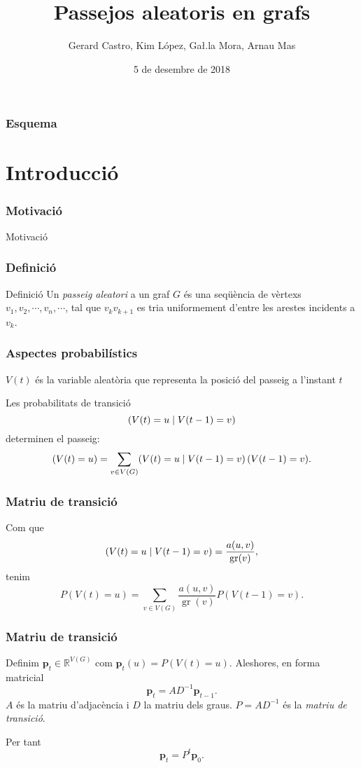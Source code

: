 \documentclass[aspectratio=169, 12pt]{beamer}
\title{Passejos aleatoris en grafs}
\author{Gerard Castro, Kim López, Ga\l.la Mora, Arnau Mas}
\date{5 de desembre de 2018}
\let\P\relax
\DeclareMathOperator{\P}{P}
\renewcommand{\vec}[1]{\mathbf{\bm #1}}
\DeclareMathOperator{\gr}{gr}
\newcommand{\R}{\mathbb{R}}
\begin{document}
\begin{frame}
	\titlepage
\end{frame}

\begin{frame}
	\frametitle{Esquema}
	\tableofcontents

\end{frame}

\section{Introducció}

\begin{frame}
	\frametitle{Motivació}
	Motivació
\end{frame}

\begin{frame}
	\frametitle{Definició}
	\begin{block}{Definició}
		Un \emph{passeig aleatori} a un graf \( G \) és una seqüència de vèrtexs \( v_1, v_2, \cdots, v_n, \cdots \), tal que \( v_kv_{k+1} \) es tria uniformement d'entre les arestes incidents a \( v_k \).
	\end{block}
\end{frame}

\begin{frame}
	\frametitle{Aspectes probabilístics}
	\( V(t) \) és la variable aleatòria que representa la posició del passeig a l'instant \( t \) \pause

	Les probabilitats de transició \[ \P(V(t) = u \mid V(t - 1) = v) \] determinen el passeig: \pause
	\begin{equation*}
		\P(V(t) = u) = \sum_{v \in V(G)} \P(V(t) = u \mid V(t - 1) = v) \, \P(V(t - 1) = v).
	\end{equation*}
\end{frame}

\begin{frame}
	\frametitle{Matriu de transició}
	Com que \[ \P(V(t) = u \mid V(t - 1) = v) = \frac{a(u,v)}{\gr(v)}, \] \pause
	tenim
	\[ P(V(t) = u) = \sum_{v \in V(G)} \frac{a(u,v)}{\gr(v)}P(V(t - 1) = v). \]
\end{frame}

\begin{frame}
	\frametitle{Matriu de transició}
	Definim \( \vec{p}_t \in \R^{V(G)} \) com \( \vec{p}_t(u) = P(V(t) = u) \). \pause Aleshores, en forma matricial \[ \vec{p}_t = AD^{-1} \vec{p}_{t - 1}. \] \( A \) és la matriu d'adjacència i \( D \) la matriu dels graus. \( P = AD^{-1} \) és la \emph{matriu de transició}. \pause

	Per tant \[ \vec{p}_t = P^t \vec{p}_0. \]
\end{frame}
\end{document}
